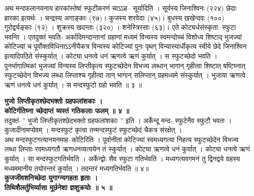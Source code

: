 \documentclass[11pt, openany]{book}
\begin{document}
{{{{\vspace{2mm}
\justifying
 अथ मन्दफलानयनाय हारकांस्तेषां स्फुटीकरणं चाऽऽह-- सूर्यादिति ।
सूर्यस्य
जिनाश्विनः (२२४) छेदाः हारका इत्यर्थः । चन्द्रस्य अगाङ्काः (९७)।
कुजस्य शरवेदाः (४५)। बुधस्य खखेन्दवः (१००) गुरोर्द्व्यङ्काः (९२) ।
शुक्रस्य खदन्ताः (३२०) । शनेस्त्रिरसाः (६३)। एते कोट्यर्धसंस्कृता:
स्फुटा भवन्ति । एतदुक्तं भवति- अर्कादिमन्दान्तानां ग्रहाणां
मध्यमं विन्यस्य स्वमन्दोच्चं विशोध्य शिष्टाद् भुजज्यां कोटिज्यां च
पूर्वोक्तविधिनाऽऽनीयैकत्र विन्यस्य कोटिज्यां पुनः पृथग् विन्यास्यार्धीकृत्य स्वीये छेदे जिनाश्विन
इत्यादिपठिते संस्कुर्यात् । कोट्या धनत्वे धनं ऋणत्वे ऋणं कुर्यात् । स
स्फुटच्छेदो
भवति । पुनर्भागात्मिकां भुजज्यां विन्यस्य लिप्तीकृत्य स्फुटच्छेदेन
विभज्य लब्धान् भागान् गृहीत्वा शिष्टात् षष्टिघ्नात् स्फुटच्छेदेन विभज्य लब्धा
लिप्ताश्च
गृहीत्वा तान् भागान् सलिप्तान् ग्रहमध्यमे संस्कुर्यात् । भुजाया
ऋणत्वे ऋणं
धनत्वे धनं कुर्यात् । स मन्दस्फुटो ग्रहो भवति ॥ ३ ॥

\newpage
\thispagestyle{fancy}
\fancyhf{}
\rhead{[स्फुटगत्यधिकारः]}
\centering
\textbf{
 भुजो लिप्तीकृतश्छेदभक्तो ग्रहफलांशकाः । \\
\hspace{1.8cm}
  कोटिर्गतिघ्ना च्छेदाप्तं व्यस्तं गतिकलाः फलम् ॥ ४ ॥ }\\
\vspace{2mm}
\justifying
 तदुक्तं--'' भुजो लिप्तीकृतश्छेदभक्तो ग्रहफलांशकाः '' इति ।
अर्केन्दू मन्द-
स्फुटेनैव स्फुटौ भवतः । कुजादीनामप्येवम् । मन्दस्फुटं कृत्वा
तन्मन्दस्फुटं स्फुटच्छेदं
चैकत्र संरक्षेत् । \\
\indent
 अथ मन्दस्फुटगत्यानयनमाह--कोटिरिति । पूर्वानीतां कोटिज्यां
स्वमध्यगत्या 
निहत्य स्फुटच्छेदेन विभज्य लब्धा लिप्ताः रवमध्यगतौ ऋणधनव्यत्ययेन तं
स्कुर्यात् । कोट्या ऋणत्वे धनं कुर्यात् । कोट्या धनत्वे ऋणं
कुर्यात् । सा मन्दस्फुटगतिर्भवति ।
अर्केन्द्वोः सैव स्फुटा गतिर्भवति । मध्यगत्यवगमनं
तु द्विनद्वये 
ग्रहस्य मध्यममानीय तयोरन्तरं कुर्यात् । तदन्तरं मध्यगतिर्भवति ॥ ४॥ \\

\centering
\textbf{
\hspace{-1cm}
 कुजजीवशनिच्छेदा युगाग्न्यगहता हृताः । \\
 तिथिशैलर्तुभिर्व्यासा मूर्छनेशा ज्ञशुक्रयोः ॥ ५ ॥}\\

}}}}
\end{document}
